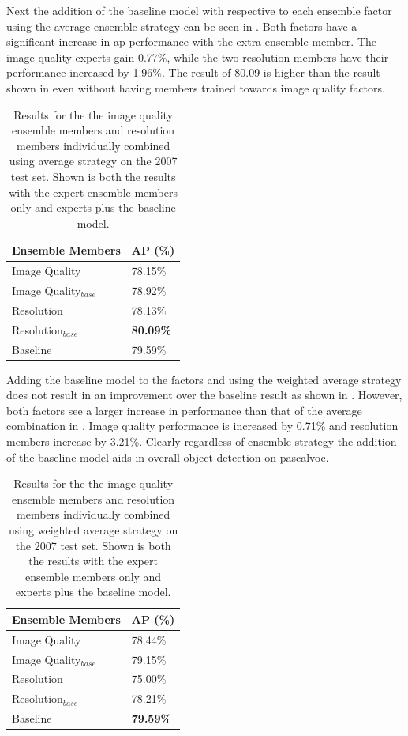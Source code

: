 Next the addition of the baseline model with respective to each ensemble factor using the average ensemble strategy can be seen in . Both factors have a significant increase in \gls{ap} performance with the extra ensemble member. The image quality experts gain 0.77\%, while the two resolution members have their performance increased by 1.96\%. The result of 80.09 is higher than the result shown in  even without having members trained towards image quality factors.

\begin{table}[h]
\centering
\caption{Results for the the image quality ensemble members and resolution members individually combined using average strategy on the 2007 test set. Shown is both the results with the expert ensemble members only and experts plus the baseline model.}
\label{tab:ensembleavg_base}
\begin{tabular}{|l|l|}
\hline
\textbf{Ensemble Members}        & \textbf{AP (\%)} \\ \hline
Image Quality & 78.15\% \\ \hline
Image Quality$_{base}$ & 78.92\% \\ \hline
Resolution    & 78.13\% \\ \hline
Resolution$_{base}$    & \textbf{80.09\%} \\ \hline
Baseline         & 79.59\% \\ \hline
\end{tabular}
\end{table}

Adding the baseline model to the factors and using the weighted average strategy does not result in an improvement over the baseline result as shown in . However, both factors see a larger increase in performance than that of the average combination in . Image quality performance is increased by 0.71\% and resolution members increase by 3.21\%. Clearly regardless of ensemble strategy the addition of the baseline model aids in overall object detection on \gls{pascalvoc}.

\begin{table}[h]
\centering
\caption{Results for the the image quality ensemble members and resolution members individually combined using weighted average strategy on the 2007 test set.  Shown is both the results with the expert ensemble members only and experts plus the baseline model.}
\label{tab:ensemblewavg_base}
\begin{tabular}{|l|l|}
\hline
\textbf{Ensemble Members}        & \textbf{AP (\%)} \\ \hline
Image Quality & 78.44\% \\ \hline
Image Quality$_{base}$ & 79.15\% \\ \hline
Resolution    & 75.00\% \\ \hline
Resolution$_{base}$    & 78.21\% \\ \hline
Baseline         & \textbf{79.59\%} \\ \hline
\end{tabular}
\end{table}

